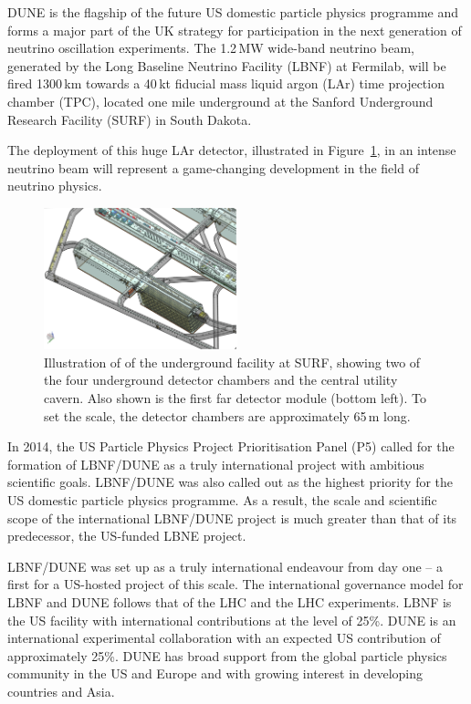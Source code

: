 DUNE is the flagship of the future US domestic particle physics programme and forms a major part of the UK strategy for participation in the next generation of neutrino oscillation experiments. The 1.2\,MW wide-band neutrino beam, generated by the Long Baseline Neutrino Facility (LBNF) at Fermilab, will be fired 1300\,km towards a 40\,kt fiducial mass liquid argon (LAr) time projection chamber (TPC),  located one mile underground at the Sanford Underground Research Facility (SURF) in South Dakota. 

The deployment of this huge LAr detector, illustrated in Figure~\ref{fig:dune:fardet1}, in an intense neutrino beam will represent a game-changing development in the field of neutrino physics. 

\begin{figure}[!htp]
\centerline{
\includegraphics[width=0.5\textwidth]{figs/DUNE_FD.png}
}
\caption[DUNE at SURF]{Illustration of of the underground facility at SURF, showing two of the four underground detector chambers and the central utility cavern. Also shown is the first far detector module (bottom left). To set the scale, the detector chambers are approximately 65\,m long. 
\label{fig:dune:fardet1}}
\end{figure}

In 2014, the US Particle Physics Project Prioritisation Panel (P5) called for the formation of LBNF/DUNE as a truly international project with ambitious scientific goals. LBNF/DUNE was also called out as the highest priority for the US domestic particle physics programme. As a result, the scale and scientific scope of the international LBNF/DUNE project is much greater than that of its predecessor, the US-funded LBNE project. 

LBNF/DUNE was set up as a truly international endeavour from day one -- a first for a US-hosted project of this scale. The international governance model for LBNF and DUNE follows that of the LHC and the LHC experiments. LBNF is the US facility with international contributions at the level of 25\%. DUNE is an international experimental collaboration with an expected US contribution of approximately 25\%. DUNE has broad support from the global particle physics community in the US and Europe and with growing interest in developing countries and Asia. 

